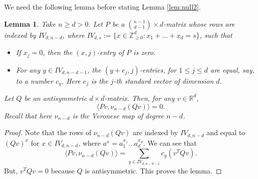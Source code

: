 \documentclass{article}
\newtheorem{lem}[thm]{Lemma}
\begin{document}
We need the following lemma before stating Lemma \ref{lem:null2}.
\begin{lem}\label{lem:null1}
    	Take $n \geq d > 0$. Let $P$ be a $\binom{n-1}{d-1} \times d$-matrix whose rows are indexed by $IV_{d,n-d}$, where $IV_{d,s} := \{ x \in \mathbb{Z}^d_{\geq 0}: x_1 + \dots + x_d = s \}$, such that
        \begin{itemize}
        \item If $x_j = 0$, then the $(x,j)$-entry of $P$ is zero.
        \item For any $y \in IV_{d,n-d-1}$, the $(y + e_j, j)$-entries, for $1 \leq j \leq d$ are equal, say, to a number $c_y$. Here $e_j$ is the $j$-th standard vector of dimension $d$.
        \end{itemize}
        Let $Q$ be an antisymmetric $d \times d$-matrix. Then, for any $v \in \mathbb{R}^d$,
        \begin{equation}\label{eq:null1}
        	\langle Pv, \nu_{n-d}(Qv)  \rangle = 0.
        \end{equation}
        Recall that here $\nu_{n-d}$ is the Veronese map of degree $n-d$.
    \end{lem}
    \begin{proof}
    	Note that the rows of $\nu_{n-d}(Qv)$ are indexed by $IV_{d,n-d}$ and equal to $(Qv)^x$ for $x \in IV_{d,n-d}$, where $a^x = a_1^{x_1} \dots a_d^{x_d}$. We can see that
        \begin{equation}
        	\langle Pv, \nu_{n-d}(Qv)  \rangle = \sum_{y \in IV_{d,n-d-1}} c_y (v^T Q v).
        \end{equation}
        But, $v^T Q v = 0$ because $Q$ is antisymmetric. This proves the lemma.
    \end{proof}
    
\end{document}
